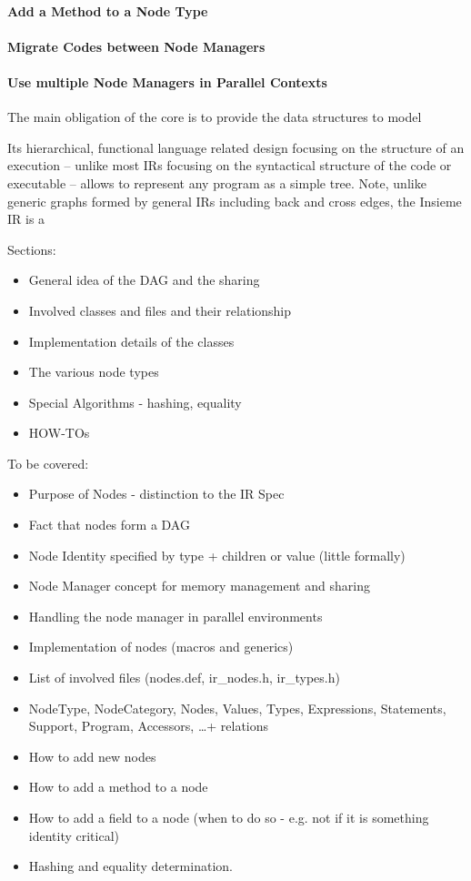 \paragraph{Add a Method to a Node Type}
\paragraph{Migrate Codes between Node Managers}
\paragraph{Use multiple Node Managers in Parallel Contexts}


The main obligation of the core is to provide the data structures to model 


Its hierarchical, functional
language related design focusing on the structure of an execution -- unlike
most IRs focusing on the syntactical structure of the code or executable --
allows to represent any program as a simple tree. Note, unlike generic graphs
formed by general IRs including back and cross edges, the Insieme IR is a 

Sections:
\begin{itemize}
  \item General idea of the DAG and the sharing
  \item Involved classes and files and their relationship
  \item Implementation details of the classes
  \item The various node types
  \item Special Algorithms - hashing, equality
  \item HOW-TOs
\end{itemize}


\label{sec:Compiler.Core.NodesAndManagers.Factories}

To be covered:
\begin{itemize}
  \item Purpose of Nodes - distinction to the IR Spec
  \item Fact that nodes form a DAG
  \item Node Identity specified by type + children or value (little formally)
  \item Node Manager concept for memory management and sharing
  \item Handling the node manager in parallel environments
  \item Implementation of nodes (macros and generics)
  \item List of involved files (nodes.def, ir\_nodes.h, ir\_types.h)
  \item NodeType, NodeCategory, Nodes, Values, Types, Expressions, Statements,
  Support, Program, Accessors, \ldots + relations
  \item How to add new nodes
  \item How to add a method to a node
  \item How to add a field to a node (when to do so - e.g. not if it is
  something identity critical)
  \item Hashing and equality determination.
\end{itemize}


